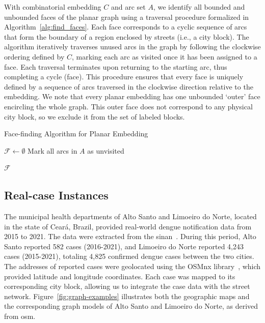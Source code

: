 With combinatorial embedding \( C \) and arc set \( A \), we identify all bounded and unbounded faces of the planar graph using a traversal procedure formalized in Algorithm~\ref{alg:find_faces}. Each face corresponds to a cyclic sequence of arcs that form the boundary of a region enclosed by streets (i.e., a city block). The algorithm iteratively traverses unused arcs in the graph by following the clockwise ordering defined by \( C \), marking each arc as visited once it has been assigned to a face. Each traversal terminates upon returning to the starting arc, thus completing a cycle (face). This procedure ensures that every face is uniquely defined by a sequence of arcs traversed in the clockwise direction relative to the embedding. We note that every planar embedding has one unbounded `outer' face encircling the whole graph. This outer face does not correspond to any physical city block, so we exclude it from the set of labeled blocks.

\begin{algorithm}[h!]
\caption{Face-finding Algorithm for Planar Embedding}\label{alg:find_faces}
\BlankLine

$\mathcal{F} \gets \emptyset$\;
Mark all arcs in $A$ as unvisited\;


\Return $\mathcal{F}$\;
\end{algorithm}

\subsection{Real-case Instances}\label{subsec:real_instances}

The municipal health departments of Alto Santo and Limoeiro do Norte, located in the state of Ceará, Brazil, provided real-world dengue notification data from 2015 to 2021. The data were extracted from the \gls{sinan}~\cite{laguardia:2004}. During this period, Alto Santo reported 582 cases (2016-2021), and Limoeiro do Norte reported 4,243 cases (2015-2021), totaling 4,825 confirmed dengue cases between the two cities. The addresses of reported cases were geolocated using the OSMnx library~\cite{boeing:2017}, which provided latitude and longitude coordinates. Each case was mapped to its corresponding city block, allowing us to integrate the case data with the street network. Figure~\ref{fig:graph-examples} illustrates both the geographic maps and the corresponding graph models of Alto Santo and Limoeiro do Norte, as derived from \gls{osm}. 

